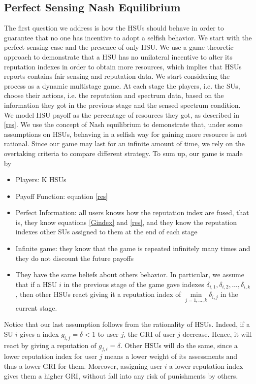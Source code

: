 \documentclass[letterpaper, 10 pt, conference]{ieeeconf}  %
\begin{document}
\subsection{Perfect Sensing Nash Equilibrium}
The first question we address is how the HSUs should behave in order to guarantee that no one has incentive to adopt a selfish behavior. We start with the perfect sensing case and the presence of only HSU. We use a game theoretic approach to demonstrate that a HSU has no unilateral incentive to alter its reputation indexes in order to obtain more resources, which implies that HSUs reports contains fair sensing and reputation data.
We start considering the process as a dynamic multistage game\cite{tadel}. At each stage the players, i.e. the SUs, choose their actions, i.e. the reputation and spectrum data, based on the information they got in the previous stage and the sensed spectrum condition. We model HSU payoff as the percentage of resources they got, as described in \ref{res}. We use the concept of Nash equilibrium to demonstrate that, under some assumptions on HSUs, behaving in a selfish way for gaining more resource is not rational\cite{tadel}. Since our game may last for an infinite amount of time, we rely on the overtaking criteria\cite{rub} to compare different strategy.
To sum up, our game is made by
\begin{itemize}
\item {Players: K HSUs}
\item {Payoff Function: equation \ref{res}}
\item {Perfect Information: all users knows how the reputation index are fused, that is, they know equations \ref{Gindex} and \ref{res}, and they know the reputation indexes other SUs assigned to them at the end of each stage}
\item{Infinite game: they know that the game is repeated infinitely many times and they do not discount the future payoffs}
\item{They have the same beliefs about others behavior. In particular, we assume that if a HSU $i$ in the previous stage of the game gave indexes $\delta_{i,1},\delta_{i,2},\dots,\delta_{i,k}$, then other HSUs react giving it a reputation index of $\min\limits_{j=1,\dots,k}\delta_{i,j}$ in the current stage.}
\end{itemize}
Notice that our last assumption follows from the rationality of HSUs. Indeed, if a SU $i$ gives a index $g_{i,j}=\delta<1$ to user $j$, the GRI of user $j$ decrease. Hence, it will react by giving a reputation of $g_{j,i}=\delta$. Other HSUs  will do the same, since a lower reputation index for user $j$ means a lower weight of its assessments and thus a lower GRI for them. Moreover, assigning user $i$ a lower reputation index gives them a higher GRI, without fall into any risk of punishments by others.
\end{document}
